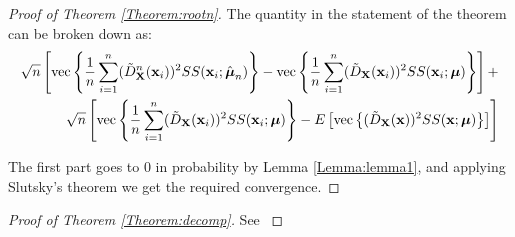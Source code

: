 \begin{proof}[Proof of Theorem \ref{Theorem:rootn}]
The quantity in the statement of the theorem can be broken down as:
\begin{eqnarray*}
\sqrt n \left[ \text{vec}\left\{ \frac{1}{n} \sum_{i=1}^n (\tilde D^n_{\mathbf{X}} ({\bf{x}}_i))^2 SS({\bf{x}}_i; \hat{{\boldsymbol{\mu}}}_n) \right\} - \text{vec}\left\{ \frac{1}{n} \sum_{i=1}^n (\tilde D_{\mathbf{X}} ({\bf{x}}_i))^2 SS({\bf{x}}_i; {\boldsymbol{\mu}}) \right\} \right] +\\
\sqrt n \left[ \text{vec}\left\{ \frac{1}{n} \sum_{i=1}^n (\tilde D_{\mathbf{X}} ({\bf{x}}_i))^2 SS({\bf{x}}_i; {\boldsymbol{\mu}}) \right\} - E \left[ \text{vec}\left\{ (\tilde D_{\mathbf{X}} ({\bf{x}}))^2 SS({\bf{x}}; {\boldsymbol{\mu}}) \right\} \right] \right]
\end{eqnarray*}

The first part goes to 0 in probability by Lemma \ref{Lemma:lemma1}, and applying Slutsky's theorem we get the required convergence.
\end{proof}

\begin{proof}[Proof of Theorem \ref{Theorem:decomp}]
See \cite{taskinen12}
\end{proof}

